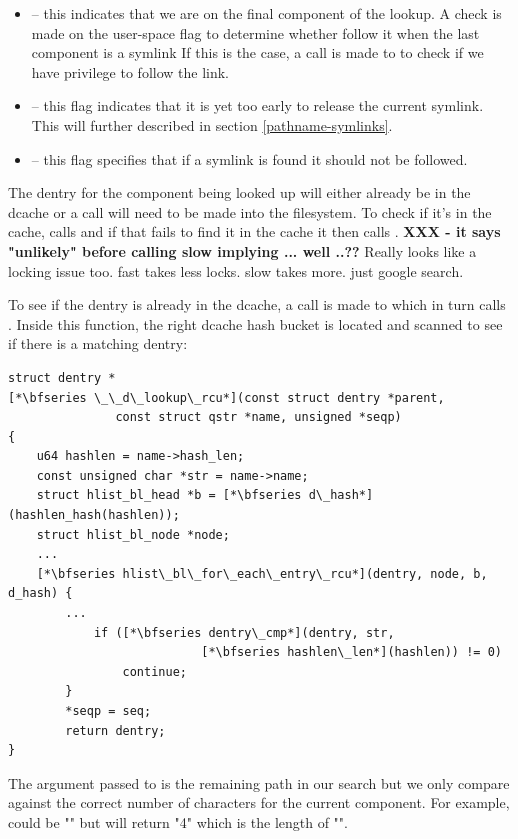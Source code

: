 \begin{itemize}
	\item {} -- this indicates that we are on the final component of the lookup. A check is made on the
		user-space flag  to determine whether follow it when the last component is a symlink If
		this is the case, a call is made to  to check if we have privilege to follow the link.
	\item {} --  this flag indicates that it is yet too early to release the current symlink. This will
		further described in section \ref{pathname-symlinks}.
	\item {} -- this flag specifies that if a symlink is found it should not be followed.
\end{itemize}

\noindent
The dentry for the component being looked up will either already be in the dcache or a call will need to be made into the filesystem. To check if it's in the cache,  calls  and if that fails to find it in the cache it then calls . \textbf{XXX - it says "unlikely" before calling slow implying ... well ..??} Really looks like a locking issue too. fast takes less locks. slow takes more. just google search.

To see if the dentry is already in the dcache, a call is made to  which in turn calls . Inside this function, the right dcache hash bucket is located and scanned to see if there is a matching dentry:

\begin{lstlisting}
struct dentry *
[*\bfseries \_\_d\_lookup\_rcu*](const struct dentry *parent,
               const struct qstr *name, unsigned *seqp)
{
    u64 hashlen = name->hash_len;
    const unsigned char *str = name->name;
    struct hlist_bl_head *b = [*\bfseries d\_hash*](hashlen_hash(hashlen));
    struct hlist_bl_node *node;
    ...
    [*\bfseries hlist\_bl\_for\_each\_entry\_rcu*](dentry, node, b, d_hash) {
        ...
            if ([*\bfseries dentry\_cmp*](dentry, str, 
                           [*\bfseries hashlen\_len*](hashlen)) != 0)
                continue;
        }
        *seqp = seq;
        return dentry; 
}
\end{lstlisting}

\noindent
The  argument passed to  is the remaining path in our search but we only compare against the correct number of characters for the current component. For example,  could be "" but  will return "4" which is the length of "".

